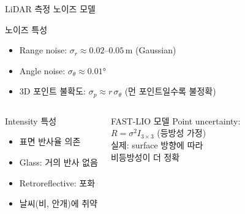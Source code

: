 \begin{frame}{LiDAR 측정 노이즈 모델}
  \begin{block}{노이즈 특성}
    \begin{itemize}
      \item Range noise: $\sigma_r \approx 0.02$--$0.05\,\text{m}$ (Gaussian)
      \item Angle noise: $\sigma_\theta \approx 0.01°$
      \item 3D 포인트 불확도: $\sigma_p \approx r\,\sigma_\theta$ (먼 포인트일수록 불정확)
    \end{itemize}
  \end{block}
  \pause
  \begin{columns}
    \begin{block}{Intensity 특성}
      \begin{itemize}
        \item 표면 반사율 의존
        \item Glass: 거의 반사 없음
        \item Retroreflective: 포화
        \item 날씨(비, 안개)에 취약
      \end{itemize}
    \end{block}
    \begin{block}{FAST-LIO 모델}
      Point uncertainty:\\
      $R = \sigma^2 I_{3\times3}$ (등방성 가정)\\[4pt]
      실제: surface 방향에 따라\\
      비등방성이 더 정확
    \end{block}
  \end{columns}
\end{frame}


